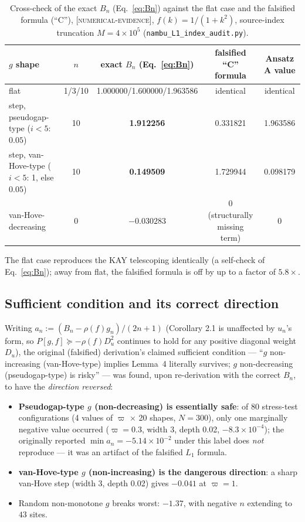 \documentclass[11pt]{article}
\begin{document}
\begin{table}[h]
\centering
\caption{Cross-check of the exact $B_n$ (Eq.~\ref{eq:Bn}) against the flat
case and the falsified formula (``C''), \textsc{[numerical-evidence]},
$f(k)=1/(1+k^2)$, source-index truncation $M=4\times10^5$
(\texttt{nambu\_L1\_index\_audit.py}).}
\label{tab:Bn-check}
\begin{tabular}{lcccc}
\toprule
$g$ shape & $n$ & exact $B_n$ (Eq.~\ref{eq:Bn}) & falsified ``C'' formula & Ansatz A value\\
\midrule
flat & 1/3/10 & 1.000000/1.600000/1.963586 & identical & identical\\
step, pseudogap-type ($i<5$: $0.05$) & 10 & \textbf{1.912256} & 0.331821 & 1.963586\\
step, van-Hove-type ($i<5$: 1, else $0.05$) & 10 & \textbf{0.149509} & 1.729944 & 0.098179\\
van-Hove-decreasing & 0 & $-0.030283$ & $0$ (structurally missing term) & $0$\\
\bottomrule
\end{tabular}
\end{table}

The flat case reproduces the KAY telescoping identically (a self-check of
Eq.~\ref{eq:Bn}); away from flat, the falsified formula is off by up to a
factor of $5.8\times$.

\subsection{Sufficient condition and its correct direction}\label{sec:sufficient}

Writing $a_n:=(B_n-\rho(f)g_n)/(2n+1)$ (Corollary 2.1 is unaffected by $u_n$'s
form, so $P[g,f]\succeq-\rho(f)D_u^2$ continues to hold for any positive
diagonal weight $D_u$), the original (falsified) derivation's claimed
sufficient condition --- ``$g$ non-increasing (van-Hove-type) implies Lemma~4
literally survives; $g$ non-decreasing (pseudogap-type) is risky'' --- was
found, upon re-derivation with the correct $B_n$, to have the
\emph{direction reversed}:

\begin{itemize}[nosep]
\item \textbf{Pseudogap-type $g$ (non-decreasing) is essentially safe}: of 80
stress-test configurations (4 values of $\varpi$ $\times$ 20 shapes,
$N=300$), only one marginally negative value occurred ($\varpi=0.3$, width
3, depth 0.02, $-8.3\times10^{-4}$); the originally reported
$\min a_n=-5.14\times10^{-2}$ under this label does \emph{not} reproduce ---
it was an artifact of the falsified $L_1$ formula.
\item \textbf{van-Hove-type $g$ (non-increasing) is the dangerous direction}:
a sharp van-Hove step (width 3, depth 0.02) gives $-0.041$ at $\varpi=1$.
\item Random non-monotone $g$ breaks worst: $-1.37$, with negative $n$
extending to $43$ sites.
\end{itemize}
\end{document}
